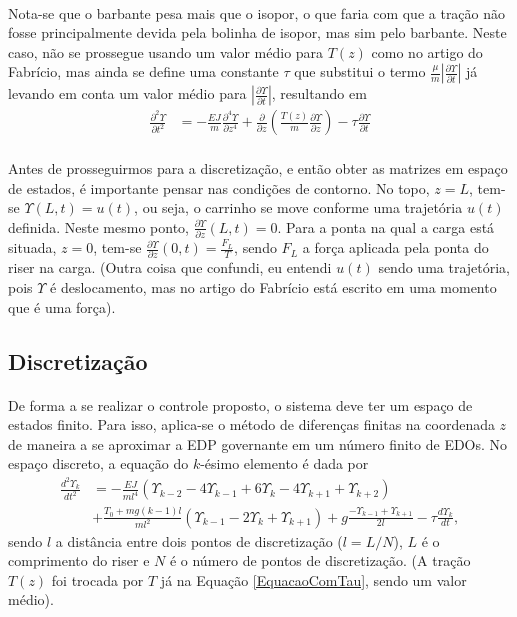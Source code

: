 \documentclass[a4paper,11pt]{scrartcl} %
\numberwithin{equation}{section} %
\numberwithin{figure}{section} %
\numberwithin{table}{section} %
\begin{document}
\paragraph{} Nota-se que o barbante pesa mais que o isopor, o que faria com que a tração não fosse principalmente devida pela bolinha de isopor, mas sim pelo barbante. Neste caso, não se prossegue usando um valor médio para $T(z)$ como no artigo do Fabrício, mas ainda se define uma constante $\tau$ que substitui o termo $\frac{\mu}{m}\left|\frac{\partial \Upsilon}{\partial t}\right|$ já levando em conta um valor médio para $\left|\frac{\partial \Upsilon}{\partial t}\right|$, resultando em \begin{align}
	\frac{\partial^2 \Upsilon}{\partial t^2} &= -\frac{EJ}{m}\frac{\partial^4 \Upsilon}{\partial z^4} + \frac{\partial}{\partial z}\left(\frac{T(z)}{m}\frac{\partial \Upsilon}{\partial z}\right) - \tau\frac{\partial \Upsilon}{\partial t}\label{EquacaoComTau}
	\end{align}
	
\paragraph{} Antes de prosseguirmos para a discretização, e então obter as matrizes em espaço de estados, é importante pensar nas condições de contorno. No topo, $z=L$, tem-se $\Upsilon(L,t)=u(t)$, ou seja, o carrinho se move conforme uma trajetória $u(t)$ definida. Neste mesmo ponto, $\frac{\partial\Upsilon}{\partial z}(L,t) = 0$. Para a ponta na qual a carga está situada, $z=0$, tem-se $\frac{\partial\Upsilon}{\partial z}(0,t) = \frac{F_L}{T}$, sendo $F_L$ a força aplicada pela ponta do riser na carga. (Outra coisa que confundi, eu entendi $u(t)$ sendo uma trajetória, pois $\Upsilon$ é deslocamento, mas no artigo do Fabrício está escrito em uma momento que é uma força).

\subsection{Discretização}
\paragraph{} De forma a se realizar o controle proposto, o sistema deve ter um espaço de estados finito. Para isso, aplica-se o método de diferenças finitas na coordenada $z$ de maneira a se aproximar a EDP governante em um número finito de EDOs. No espaço discreto, a equação do $k$-ésimo elemento é dada por \begin{align}
	\frac{d^2\Upsilon_k}{dt^2} &= -\frac{EJ}{m l^4}\left(\Upsilon_{k-2} - 4\Upsilon_{k-1}+6\Upsilon_{k}-4\Upsilon_{k+1}+\Upsilon_{k+2}\right)\nonumber\\
	&+ \frac{T_0+mg(k-1)l}{m l^2}\left(\Upsilon_{k-1}-2\Upsilon_{k} + \Upsilon_{k+1}\right)+g\frac{-\Upsilon_{k-1}+\Upsilon_{k+1}}{2l}-\tau\frac{d\Upsilon_k}{dt},
\end{align} sendo $l$ a distância entre dois pontos de discretização ($l = L/N$), $L$ é o comprimento do riser e $N$ é o número de pontos de discretização. (A tração $T(z)$ foi trocada por $T$ já na Equação  \ref{EquacaoComTau}, sendo um valor médio).
\end{document}

